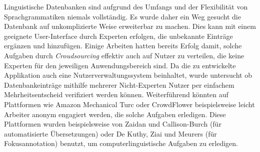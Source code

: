 Linguistische Datenbanken sind aufgrund des Umfangs und der Flexibilität von Sprachgrammatiken niemals vollständig. Es wurde daher ein Weg gesucht die Datenbank auf unkomplizierte Weise erweiterbar zu machen. Dies kann mit einem geeignete User-Interface durch Experten erfolgen, die unbekannte Einträge ergänzen und hinzufügen. Einige Arbeiten hatten bereits Erfolg damit, solche Aufgaben durch \textit{Croudsourcing} effektiv auch auf Nutzer zu verteilen, die keine Experten für den jeweiligen Anwendungsbereich sind. Da die zu entwickelte Applikation auch eine Nutzerverwaltungssystem beinhaltet, wurde untersucht ob Datenbankeinträge mithilfe mehrerer Nicht-Experten Nutzer per einfachem Mehrheitsentscheid verifiziert werden können. Weiterführend könnten auf Plattformen wie Amazon Mechanical Turc oder CrowdFlower beispielsweise leicht Arbeiter anonym engagiert werden, die solche Aufgaben erledigen\cite{Snow2008}. Diese Plattformen wurden beispielsweise von Zaidan und Callison-Burch (für automatisierte Übersetzungen)\cite{Zaidan2011} oder De Kuthy, Ziai und Meurers\cite{Meurers2015} (für Fokusannotation) benutzt, um computerlinguistische Aufgaben zu erledigen.